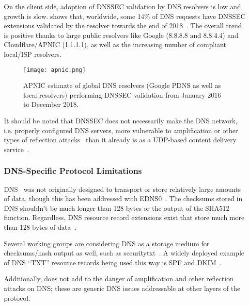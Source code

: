 On the client side, adoption of DNSSEC validation by DNS resolvers is low and
growth is slow.  shows that, worldwide, some 14\% of DNS requests
have DNSSEC extensions validated by the resolver towards the end of
2018~\cite{APNIC}. The overall trend is positive thanks to large public
resolvers like Google (8.8.8.8 and 8.8.4.4) and Cloudflare/APNIC (1.1.1.1), as
well as the increasing number of compliant local/ISP resolvers.

\begin{figure}[t]
    \centering
    \texttt{[image: apnic.png]}
    \caption{APNIC estimate of global DNS resolvers (Google PDNS as well as
    local resolvers) performing DNSSEC validation from January 2016 to December
    2018.}\label{fig:apnic}
\end{figure}

It should be noted that DNSSEC does not necessarily make the DNS network, i.e.
properly configured DNS servers, more vulnerable to amplification or other types
of reflection attacks~\cite{Ariya} than it already is as a UDP-based content
delivery service~\cite{USCERT, Vixie}.

\subsubsection{DNS-Specific Protocol Limitations}

DNS~\cite{DNS1} was not originally designed to transport or store relatively
large amounts of data, though this has been addressed with EDNS0~\cite{EDNS}.
The checksums stored in DNS shouldn't be much longer than 128 bytes or the
output of the SHA512 function. Regardless, DNS resource record extensions exist
that store much more than 128 bytes of data~\cite{CERT, IPSECKEY, DANE3, DANE1}.

Several working groups are considering DNS as a storage medium for
checksums/hash output as well, such as securitytxt~\cite{draft-sectxt}. A widely
deployed example of DNS ``TXT'' resource records being used this way is SPF and
DKIM~\cite{DKIM}.

Additionally, \SYSTEM{} does not add to the danger of amplification and other
reflection attacks on DNS; these are generic DNS issues addressable at other
layers of the protocol.


